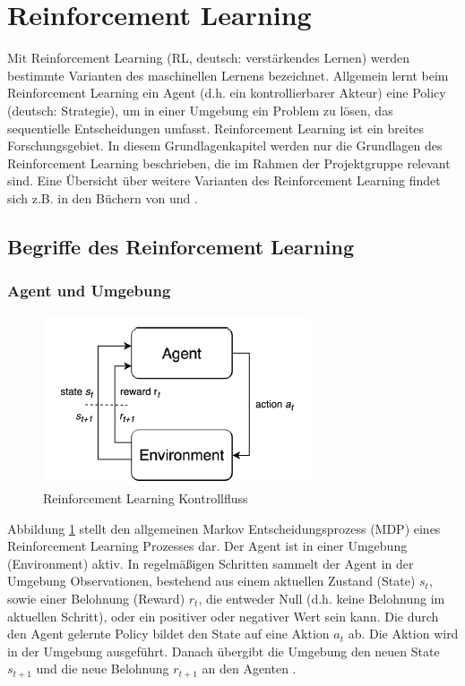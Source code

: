 \section{Reinforcement Learning}
Mit Reinforcement Learning (RL, deutsch: verstärkendes Lernen) werden bestimmte Varianten des maschinellen Lernens bezeichnet. Allgemein lernt beim Reinforcement Learning ein Agent (d.h. ein kontrollierbarer Akteur) eine Policy (deutsch: Strategie), um in einer Umgebung ein Problem zu lösen, das sequentielle Entscheidungen umfasst. Reinforcement Learning ist ein breites Forschungsgebiet. In diesem Grundlagenkapitel werden nur die Grundlagen des Reinforcement Learning beschrieben, die im Rahmen der Projektgruppe relevant sind. Eine Übersicht über weitere Varianten des Reinforcement Learning findet sich z.B. in den Büchern von \citeauthor{FoundationsDeepRL} und \citeauthor{deepRL-2020}.

\subsection{Begriffe des Reinforcement Learning}

\subsubsection{Agent und Umgebung}
\begin{figure}
    \centering
    \includegraphics{resources/img/Reinforcement_Learning/RL Control Loop.png}
    \caption{Reinforcement Learning Kontrollfluss \cite{FoundationsDeepRL}}
    \label{fig:rl_control_loop}
\end{figure}

Abbildung \ref{fig:rl_control_loop} stellt den allgemeinen Markov Entscheidungsprozess (MDP) eines Reinforcement Learning Prozesses dar. Der Agent ist in einer Umgebung (Environment) aktiv. In regelmäßigen Schritten sammelt der Agent in der Umgebung Observationen, bestehend aus einem aktuellen Zustand (State) $s_t$, sowie einer Belohnung (Reward) $r_t$, die entweder Null (d.h. keine Belohnung im aktuellen Schritt), oder ein positiver oder negativer Wert sein kann. Die durch den Agent gelernte Policy bildet den State auf eine Aktion $a_t$ ab. Die Aktion wird in der Umgebung ausgeführt. Danach übergibt die Umgebung den neuen State $s_{t+1}$ und die neue Belohnung $r_{t+1}$ an den Agenten \cite{FoundationsDeepRL}.

